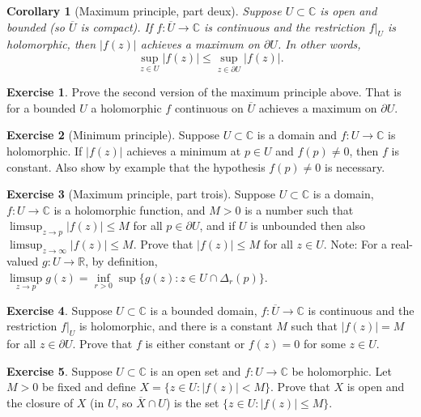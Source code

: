 \documentclass[12pt,openany]{book}
\newcommand{\sabs}[1]{\lvert {#1} \rvert}
\newcommand{\C}{{\mathbb{C}}}
\newcommand{\R}{{\mathbb{R}}}
\theoremstyle{plain}
\newtheorem{cor}[thm]{Corollary}
\theoremstyle{remark}
\theoremstyle{definition}
\newenvironment{exbox}{%
    \def\FrameCommand{\vrule width 1pt \relax\hspace{10pt}}%
    \MakeFramed{\advance\hsize-\width\FrameRestore}%
}{%
    \endMakeFramed
}
\theoremstyle{exercise}
\newtheorem{exercise}{Exercise}[section]
\theoremstyle{example}
\begin{document}
\begin{cor}[Maximum principle, part deux]
%
Suppose $U \subset \C$ is open and bounded (so $\overline{U}$ is compact).
If $f \colon \overline{U} \to \C$ is continuous and the restriction $f|_{U}$
is holomorphic, then $\sabs{f(z)}$ achieves a maximum on $\partial U$.  In
other words,
\begin{equation*}
\sup_{z \in U} \sabs{f(z)} \leq
\sup_{z \in \partial U} \sabs{f(z)} .
\end{equation*}
\end{cor}

\begin{exbox}
\begin{exercise}
Prove the second version of the maximum principle above.
That is for a bounded $U$ a holomorphic $f$ continuous
on $\overline{U}$ achieves a maximum on $\partial U$.
\end{exercise}

\begin{exercise}[Minimum principle]
Suppose $U \subset \C$ is a domain and
$f \colon U \to \C$ is holomorphic.
If $\sabs{f(z)}$ achieves a minimum at $p \in U$ and $f(p) \not= 0$,
then $f$ is constant.  Also show by example that the hypothesis
$f(p) \not= 0$ is necessary.
\end{exercise}

\begin{exercise}[Maximum principle, part trois]
Suppose $U \subset \C$ is a domain, $f \colon U \to \C$ is a holomorphic
function, and $M > 0$ is a number such that
$\limsup_{z \to p} \sabs{f(z)} \leq M$ for all $p \in \partial U$,
and if $U$ is unbounded then also 
$\limsup_{z \to \infty} \sabs{f(z)} \leq M$.  Prove that
$\sabs{f(z)} \leq M$ for all $z \in U$.
Note: For a real-valued $g \colon U \to \R$,
by definition,
$\limsup\limits_{z\to p} g(z) = \inf\limits_{r > 0} \sup \bigl\{ g(z) : z \in U
\cap \Delta_r(p) \bigr\}$.
\end{exercise}

\begin{exercise}
Suppose $U \subset \C$ is a bounded domain,
$f \colon \overline{U} \to \C$ is continuous and the restriction $f|_{U}$
is holomorphic, and there is a constant $M$ such that $\sabs{f(z)} = M$
for all $z \in \partial U$.  Prove that $f$ is either constant or $f(z) = 0$
for some $z \in U$.
\end{exercise}

\begin{exercise}
Suppose $U \subset \C$ is an open set and $f \colon U \to \C$ be holomorphic.
Let $M > 0$ be fixed and
define $X = \bigl\{ z \in U : \sabs{f(z)} < M \bigr\}$.
Prove that $X$ is open and the closure of $X$ (in $U$, so $\overline{X} \cap U$) is the set
$\bigl\{ z \in U : \sabs{f(z)} \leq M \bigr\}$.
\end{exercise}


\end{exbox}
\end{document}
